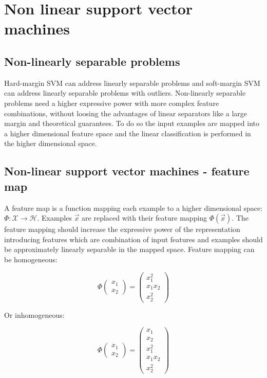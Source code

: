\chapter{Non linear support vector machines}

\section{Non-linearly separable problems}
Hard-margin SVM can address linearly separable problems and soft-margin SVM can address linearly separable problems with outliers.
Non-linearly separable problems need a higher expressive power with more complex feature combinations, without loosing the advantages of linear separators like a large margin and theoretical guarantees.
To do so the input examples are mapped into a higher dimensional feature space and the linear classification is performed in the higher dimensional space.

\section{Non-linear support vector machines - feature map}
A feature map is a function mapping each example to a higher dimensional space: $\Phi:\mathcal{X}\rightarrow\mathcal{H}$.
Examples $\vec{x}$ are replaced with their feature mapping $\Phi(\vec{x})$.
The feature mapping should increase the expressive power of the representation introducing features which are combination of input features and examples should be approximately linearly separable in the mapped space.
Feature mapping can be homogeneous:

$$\Phi\begin{pmatrix}x_1\\x_2\end{pmatrix} = \begin{pmatrix}x_1^2\\x_1x_2\\x_2^2\end{pmatrix}$$

Or inhomogeneous:

$$\Phi\begin{pmatrix}x_1\\x_2\end{pmatrix} = \begin{pmatrix}x_1\\x_2\\x_1^2\\x_1x_2\\x_2^2\end{pmatrix}$$


